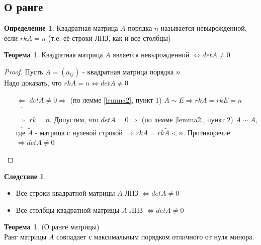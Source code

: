 \documentclass[a4paper, 12pt]{article}
\newcommand\tab[1][.5cm]{\hspace*{#1}}
\newcounter{thcount}
\theoremstyle{definition}
\newtheorem*{definition}{Определение}
\newtheorem*{theorem}{Теорема}
\newtheorem*{consequense}{Следствие}
\newtheorem{theoremnum}[thcount]{Теорема}
\begin{document}
  \subsection{О ранге}
  \begin{definition}
    Квадратная матрица $A$ порядка $n$ называется невырожденной, если $rkA = n$ (т.е. её строки ЛНЗ, как и все столбцы)
  \end{definition}
  \begin{theoremnum}
    Квадратная матрица $A$ является невырожденной $\Longleftrightarrow detA \not = 0$ 
  \end{theoremnum}  
  \begin{proof}
    Пусть $A = (a_{ij})$ - квадратная матрица порядка $n$ \\
    Надо доказать, что $rkA=n \Longleftrightarrow detA \not = 0$ 
    \begin{itemize}
      \item[$\underline{\Longleftarrow} $] $detA \not = 0 \Longrightarrow $ (по лемме \eqref{lemma2}, пункт 1) $A \sim E \Longrightarrow rkA = rkE = n$
      \item[$\underline{\Longrightarrow} $] $rk = n$. Допустим, что $detA = 0 \Longrightarrow $ (по лемме \eqref{lemma2}, пункт 2) $A \sim \widetilde{A}$, где $\widetilde{A}$ - матрица с нулевой строкой $\Longrightarrow rkA = rk \widetilde{A} < n$. Противоречие $\Longrightarrow detA \not = 0$        
    \end{itemize}
  \end{proof} 
  \begin{consequense} \tab
    \begin{itemize}
      \item Все строки квадратной матрицы $A$ ЛНЗ $\Longleftrightarrow detA \not = 0$
      \item Все столбцы квадратной матрицы $A$ ЛНЗ $\Longleftrightarrow detA \not = 0$
    \end{itemize}
  \end{consequense} 
  \begin{theorem}
    (О ранге матрицы) \\
    Ранг матрицы $A$ совпадает с максимальным порядком отличного от нуля минора.
  \end{theorem}  
\end{document}
